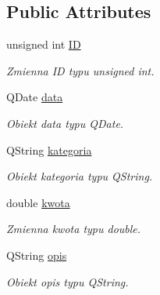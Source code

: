 \subsection*{Public Attributes}
\begin{DoxyCompactItemize}
\item 
\hypertarget{class_wydatek_aaa67349adee2d242127ca4e7114e800b}{}unsigned int \hyperlink{class_wydatek_aaa67349adee2d242127ca4e7114e800b}{I\+D}\label{class_wydatek_aaa67349adee2d242127ca4e7114e800b}

\begin{DoxyCompactList}\small\item\em Zmienna I\+D typu unsigned int. \end{DoxyCompactList}\item 
\hypertarget{class_wydatek_a711d55393993069d2795f0d545de64d1}{}Q\+Date \hyperlink{class_wydatek_a711d55393993069d2795f0d545de64d1}{data}\label{class_wydatek_a711d55393993069d2795f0d545de64d1}

\begin{DoxyCompactList}\small\item\em Obiekt data typu Q\+Date. \end{DoxyCompactList}\item 
\hypertarget{class_wydatek_a39c836807249ffa4c683455b5ef8b2a0}{}Q\+String \hyperlink{class_wydatek_a39c836807249ffa4c683455b5ef8b2a0}{kategoria}\label{class_wydatek_a39c836807249ffa4c683455b5ef8b2a0}

\begin{DoxyCompactList}\small\item\em Obiekt kategoria typu Q\+String. \end{DoxyCompactList}\item 
\hypertarget{class_wydatek_a1786e869ea300a3a9d2cef7e89a10419}{}double \hyperlink{class_wydatek_a1786e869ea300a3a9d2cef7e89a10419}{kwota}\label{class_wydatek_a1786e869ea300a3a9d2cef7e89a10419}

\begin{DoxyCompactList}\small\item\em Zmienna kwota typu double. \end{DoxyCompactList}\item 
\hypertarget{class_wydatek_ac9ea73c7ca92621388756045fb467881}{}Q\+String \hyperlink{class_wydatek_ac9ea73c7ca92621388756045fb467881}{opis}\label{class_wydatek_ac9ea73c7ca92621388756045fb467881}

\begin{DoxyCompactList}\small\item\em Obiekt opis typu Q\+String. \end{DoxyCompactList}\end{DoxyCompactItemize}


